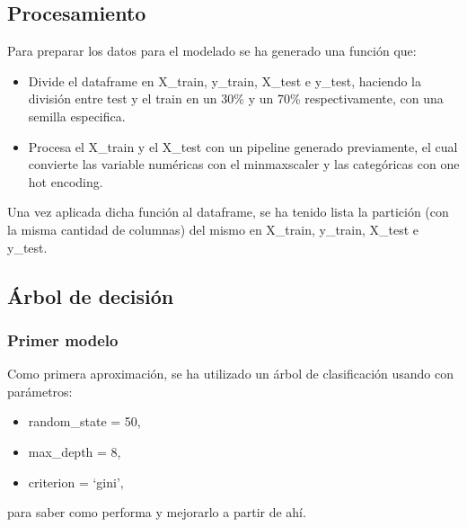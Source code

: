 \documentclass[a4paper]{article}
\begin{document}
    \subsection{Procesamiento}

        Para preparar los datos para el modelado se ha generado una función que:
        \begin{itemize}
            \item  Divide el dataframe en X\_train, y\_train, X\_test e y\_test, haciendo la división entre test y el train en un 30\% y un 70\% respectivamente, con una semilla especifica.
            \item  Procesa el X\_train y el X\_test con un pipeline generado previamente, el cual convierte las variable numéricas con el minmaxscaler y las categóricas con one hot encoding.
        \end{itemize}

        Una vez aplicada dicha función al dataframe, se ha tenido lista la partición (con la misma cantidad de columnas) del mismo en X\_train, y\_train, X\_test e y\_test.

    \subsection{Árbol de decisión}

        \subsubsection{Primer modelo}

            Como primera aproximación, se ha utilizado un árbol de clasificación usando con parámetros:
            \begin{itemize}
                \item random\_state = 50,
                \item max\_depth = 8,
                \item criterion = `gini',
            \end{itemize}
            para saber como performa y mejorarlo a partir de ahí.

 \vspace{1cm}
 
\end{document}
